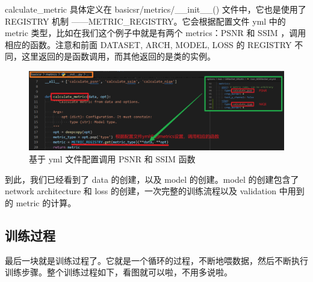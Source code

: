 \documentclass[../main.tex]{subfiles}
\begin{document}
\begin{enumerate}
\begin{enumerate}
                    calculate\_metric 具体定义在 basicsr/metrics/\_\_init\_\_() 文件中，它也是使用了 REGISTRY 机制 ——METRIC\_REGISTRY。它会根据配置文件 yml 中的 metric 类型，比如在我们这个例子中就是有两个 metrics：PSNR 和 SSIM ，调用相应的函数。注意和前面 DATASET, ARCH, MODEL, LOSS 的 REGISTRY 不同，这里返回的是函数调用，而其他返回的是类的实例。
                    \begin{figure}[H]
                        \begin{center}
                            \includegraphics[width=0.7\linewidth]{figures/getting_start_20.png}
                            \caption{基于 yml 文件配置调用 PSNR 和 SSIM 函数}
                            \label{fig:getting_start_19}
                        \end{center}
                        \vspace{-0.5cm}
                    \end{figure}

                    到此，我们已经看到了 data 的创建，以及 model 的创建。model 的创建包含了 network architecture 和 loss 的创建，一次完整的训练流程以及 validation 中用到的 metric 的计算。

          \end{enumerate}

          \subsection{训练过程}

          最后一块就是训练过程了。它就是一个循环的过程，不断地喂数据，然后不断执行训练步骤。整个训练过程如下，看图就可以啦，不用多说啦。


\end{enumerate}
\end{document}
